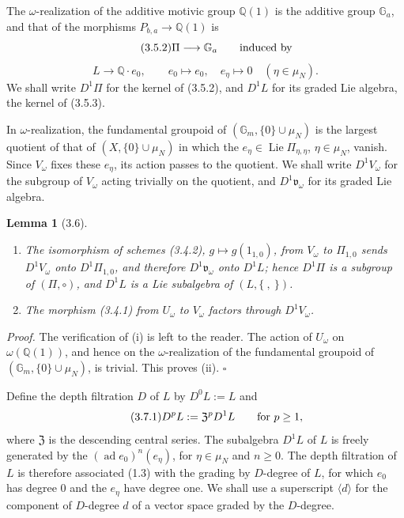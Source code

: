 \documentclass[10pt,a4paper]{article}
\newcommand{\Gm}{\mathbb G_m}
\newcommand{\Ga}{\mathbb G_a}
\newcommand{\muN}{\mu_N}
\newcommand{\Q}{\mathbb Q}
\newcommand{\Lie}{\operatorname{Lie}}
\newcommand{\ad}{\operatorname{ad}}
\newcommand{\vomega}{\mathfrak v_\omega}
\newcommand{\Zcen}{\mathfrak Z}
\theoremstyle{deligne}
\newtheorem*{lemma*}{Lemma}
\newenvironment{proofdel}{\textit{Proof.}}{\hfill$\square$}
\newcommand{\heading}[1]{\vspace{0.65em}\noindent{\bfseries #1}\quad}
\begin{document}
The \(\omega\)-realization of the additive motivic group \(\Q(1)\) is the additive group \(\Ga\), and that of the morphisms \(P_{b,a}\to\Q(1)\) is
\[
\tag{3.5.2}
\Pi\longrightarrow\Ga\qquad\hbox{induced by}
\]
\[
\tag{3.5.3}
L\longrightarrow\Q\cdot e_0,\qquad e_0\longmapsto e_0,\quad e_\eta\longmapsto0\quad(\eta\in\muN).
\]
We shall write \(D^1\Pi\) for the kernel of (3.5.2), and \(D^1L\) for its graded Lie algebra, the kernel of (3.5.3).

In \(\omega\)-realization, the fundamental groupoid of \((\Gm,\{0\}\cup\muN)\) is the largest quotient of that of \((X,\{0\}\cup\muN)\) in which the \(e_\eta\in\Lie\Pi_{\eta,\eta}\), \(\eta\in\muN\), vanish. Since \(V_\omega\) fixes these \(e_\eta\), its action passes to the quotient. We shall write \(D^1V_\omega\) for the subgroup of \(V_\omega\) acting trivially on the quotient, and \(D^1\vomega\) for its graded Lie algebra.

\begin{lemma*}[3.6]
\begin{enumerate}[label=(\roman*)]
\item The isomorphism of schemes (3.4.2), \(g\mapsto g(1_{1,0})\), from \(V_\omega\) to \(\Pi_{1,0}\) sends \(D^1V_\omega\) onto \(D^1\Pi_{1,0}\), and therefore \(D^1\vomega\) onto \(D^1L\); hence \(D^1\Pi\) is a subgroup of \((\Pi,\circ)\), and \(D^1L\) is a Lie subalgebra of \((L,\{\ ,\ \})\).
\item The morphism (3.4.1) from \(U_\omega\) to \(V_\omega\) factors through \(D^1V_\omega\).
\end{enumerate}
\end{lemma*}

\begin{proofdel}
The verification of (i) is left to the reader. The action of \(U_\omega\) on \(\omega(\Q(1))\), and hence on the \(\omega\)-realization of the fundamental groupoid of \((\Gm,\{0\}\cup\muN)\), is trivial. This proves (ii).
\end{proofdel}

\heading{3.7.} Define the depth filtration \(D\) of \(L\) by \(D^0L:=L\) and
\[
\tag{3.7.1}
D^pL:=\Zcen^pD^1L\qquad\hbox{for }p\ge1,
\]
where \(\Zcen\) is the descending central series. The subalgebra \(D^1L\) of \(L\) is freely generated by the \((\ad e_0)^n(e_\eta)\), for \(\eta\in\muN\) and \(n\ge0\). The depth filtration of \(L\) is therefore associated (1.3) with the grading by \(D\)-degree of \(L\), for which \(e_0\) has degree \(0\) and the \(e_\eta\) have degree one. We shall use a superscript \(\langle d\rangle\) for the component of \(D\)-degree \(d\) of a vector space graded by the \(D\)-degree.
\end{document}
